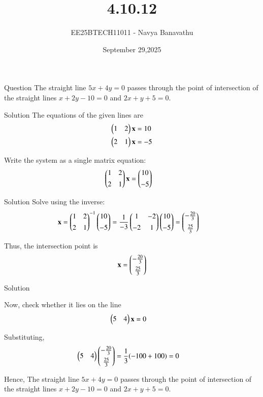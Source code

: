 \documentclass{beamer}
\title{4.10.12}
\date{September 29,2025}
\author{EE25BTECH11011 - Navya Banavathu}
\begin{document}
\frame{\titlepage}

\begin{frame}{Question}
 The straight line $5x+4y=0$ passes through the point of intersection of the straight lines $x+2y-10 = 0$ and $2x+y+5 = 0$.
\end{frame}

\begin{frame}{Solution}
The equations of the given lines are
\begin{align}
    \begin{pmatrix}1 & 2\end{pmatrix}\mathbf{x} &= 10 \label{eq1}\\
    \begin{pmatrix}2 & 1\end{pmatrix}\mathbf{x} &= -5 \label{eq2}
\end{align}

Write the system as a single matrix equation:
\begin{align}
\begin{pmatrix}1 & 2\\[4pt]2 & 1\end{pmatrix}\mathbf{x} &= \begin{pmatrix}10\\[4pt]-5\end{pmatrix}
\end{align}
\end{frame}

\begin{frame}{Solution}
Solve using the inverse:
\begin{align}
\mathbf{x} 
&= \begin{pmatrix}1 & 2\\[4pt]2 & 1\end{pmatrix}^{-1}\begin{pmatrix}10\\[4pt]-5\end{pmatrix}= \frac{1}{-3}\begin{pmatrix}1 & -2\\[4pt]-2 & 1\end{pmatrix}\begin{pmatrix}10\\[4pt]-5\end{pmatrix} = \begin{pmatrix}-\tfrac{20}{3}\\[6pt]\tfrac{25}{3}\end{pmatrix}
\end{align}

Thus, the intersection point is
\begin{align}
\mathbf{x} = \begin{pmatrix}-\tfrac{20}{3}\\[4pt]\tfrac{25}{3}\end{pmatrix}
\end{align}
\end{frame}

\begin{frame}{Solution}

Now, check whether it lies on the line
\begin{align}
\begin{pmatrix}5 & 4\end{pmatrix}\mathbf{x} &= 0
\end{align}

Substituting,
\begin{align}
\begin{pmatrix}5 & 4\end{pmatrix}\begin{pmatrix}-\tfrac{20}{3}\\[4pt]\tfrac{25}{3}\end{pmatrix}
&= \frac{1}{3}(-100+100)= 0 
\end{align}

Hence, The straight line $5x+4y=0$ passes through the point of intersection of the straight lines $x+2y-10 = 0$ and $2x+y+5 = 0$. 
\end{frame}
\end{document}
